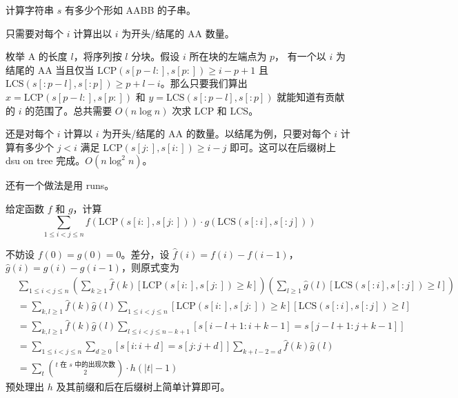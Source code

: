 \begin{exercise}[{[NOI2016] 优秀的拆分}]
    计算字符串 $s$ 有多少个形如 AABB 的子串。
\end{exercise}
\begin{solution}[聪明的做法]
    只需要对每个 $i$ 计算出以 $i$ 为开头/结尾的 AA 数量。

    枚举 A 的长度 $l$，将序列按 $l$ 分块。假设 $i$ 所在块的左端点为 $p$， 有一个以 $i$ 为结尾的 AA 当且仅当 $\mathrm{LCP}(s[p-l:],s[p:])\ge i-p+1$ 且 $\mathrm{LCS}(s[:p-l],s[:p])\ge p+l-i$。那么只要我们算出 $x=\mathrm{LCP}(s[p-l:],s[p:])$ 和 $y=\mathrm{LCS}(s[:p-l],s[:p])$ 就能知道有贡献的 $i$ 的范围了。总共需要 $O(n\log n)$ 次求 LCP 和 LCS。
\end{solution}
\begin{solution}[不太聪明的做法]
    还是对每个 $i$ 计算以 $i$ 为开头/结尾的 AA 的数量。以结尾为例，只要对每个 $i$ 计算有多少个 $j<i$ 满足 $\mathrm{LCP}(s[j:],s[i:])\ge i-j$ 即可。这可以在后缀树上 dsu on tree 完成。$O(n\log^2 n)$。
\end{solution}
\begin{remark}
    还有一个做法是用 runs。
\end{remark}


\begin{exercise}
    给定函数 $f$ 和 $g$，计算
    $$
    \sum_{1\le i<j\le n}f(\mathrm{LCP}(s[i:],s[j:]))\cdot g(\mathrm{LCS}(s[:i],s[:j]))
    $$
\end{exercise}
\begin{solution}
    不妨设 $f(0)=g(0)=0$。差分，设 $\hat f(i)=f(i)-f(i-1)$，$\hat g(i)=g(i)-g(i-1)$，则原式变为
    $$
    \begin{aligned}
    &\sum_{1\le i<j\le n}\left(\sum_{k\ge 1}\hat f(k)[\mathrm{LCP}(s[i:],s[j:])\ge k]\right)\left(\sum_{l\ge 1}\hat g(l)[\mathrm{LCS}(s[:i],s[:j])\ge l]\right)\\
    &=\sum_{k,l\ge 1}\hat f(k)\hat g(l)\sum_{1\le i<j\le n}[\mathrm{LCP}(s[i:],s[j:])\ge k][\mathrm{LCS}(s[:i],s[:j])\ge l]\\
    &=\sum_{k,l\ge 1}\hat f(k)\hat g(l)\sum_{l\le i<j\le n-k+1}[s[i-l+1:i+k-1]=s[j-l+1:j+k-1]]\\
    &=\sum_{1\le i<j\le n}\sum_{d\ge 0}[s[i:i+d]=s[j:j+d]]\sum_{k+l-2=d}\hat f(k)\hat g(l)\\
    &=\sum_{t}\binom{t\text{ 在 }s\text{ 中的出现次数}}{2}\cdot h(|t|-1)
    \end{aligned}
    $$
    预处理出 $h$ 及其前缀和后在后缀树上简单计算即可。
\end{solution}

